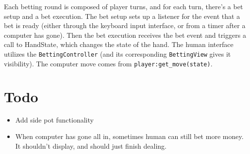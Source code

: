 \documentclass[10pt]{article}
\begin{document}
Each betting round is composed of player turns, and for each turn,
there's a bet setup and a bet execution. The bet setup sets up a
listener for the event that a bet is ready (either through the
keyboard input interface, or from a timer after a computer has
gone). Then the bet execution receives the bet event and triggers a
call to HandState, which changes the state of the hand. The human
interface utilizes the \verb^BettingController^ (and its corresponding
\verb^BettingView^ gives it visibility). The computer move comes from
\verb^player:get_move(state)^.

\section*{Todo}
\begin{itemize}
\item Add side pot functionality
\item When computer has gone all in, sometimes human can still bet
  more money. It shouldn't display, and should just finish dealing.
\end{itemize}
\end{document}
